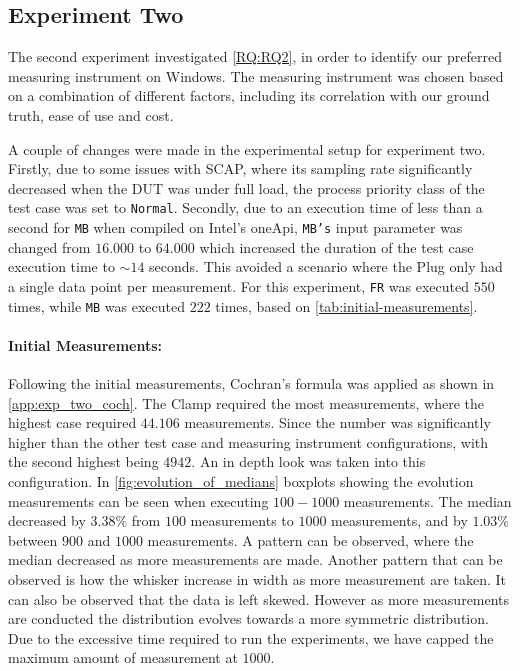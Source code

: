 \subsection{Experiment Two}\label{subsec:exp_two}

The second experiment investigated \cref{RQ:RQ2}, in order to identify our preferred measuring instrument on Windows. The measuring instrument was chosen based on a combination of different factors, including its correlation with our ground truth, ease of use and cost. 

A couple of changes were made in the experimental setup for experiment two. Firstly, due to some issues with SCAP, where its sampling rate significantly decreased when the DUT was under full load, the process priority class of the test case was set to \texttt{Normal}. Secondly, due to an execution time of less than a second for \texttt{MB} when compiled on Intel's oneApi, \texttt{MB's} input parameter was changed from $16.000$ to $64.000$ which increased the duration of the test case execution time to $\sim 14$ seconds. This avoided a scenario where the Plug only had a single data point per measurement. For this experiment, \texttt{FR} was executed $550$ times, while \texttt{MB} was executed $222$ times, based on \cref{tab:initial-measurements}.

\paragraph{Initial Measurements:} Following the initial measurements, Cochran's formula was applied as shown in \cref{app:exp_two_coch}. %
The Clamp required the most measurements, where the highest case required $44.106$ measurements. Since the number was significantly higher than the other test case and measuring instrument configurations, with the second highest being $4942$. An in depth look was taken into this configuration. In \cref{fig:evolution_of_medians} boxplots showing the evolution measurements can be seen when executing $100-1000$ measurements. The median decreased by $3.38\%$ from $100$ measurements to $1000$ measurements, and by $1.03\%$ between $900$ and $1000$ measurements. A pattern can be observed, where the median decreased as more measurements are made. Another pattern that can be observed is how the whisker increase in width as more measurement are taken. It can also be observed that the data is left skewed. However as more measurements are conducted the distribution evolves towards a more symmetric distribution. Due to the excessive time required to run the experiments, we have capped the maximum amount of measurement at $1000$.

